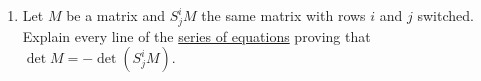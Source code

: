 \begin{enumerate}
\item Let $M$ be a matrix and $S^i_jM$ the same matrix with rows \(i\) and \(j\) switched.  Explain every line of the 
\hyperlink{rowswap}{series of equations} proving that $\det M = -\det (S^i_jM)$.


%
%
%
%
%
%
%
%




\end{enumerate}
